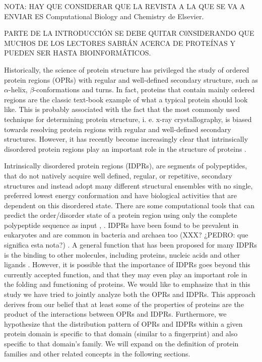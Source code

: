 \documentclass[preprint,12pt]{elsarticle}
\begin{document}
\par NOTA: HAY QUE CONSIDERAR QUE LA REVISTA A LA QUE SE VA A ENVIAR ES Computational Biology and Chemistry de Elsevier. \par PARTE DE LA INTRODUCCIÓN SE DEBE QUITAR C0NSIDERANDO QUE MUCHOS DE LOS LECTORES SABRÁN ACERCA DE PROTEÍNAS Y PUEDEN SER HASTA BIOINFORMÁTICOS. \par


Historically, the science of protein structure has privileged the study of ordered protein regions (OPRs)  with regular and well-defined secondary structure, such as  $\alpha$-helix, $\beta$-conformations and turns. In fact, proteins that contain mainly ordered regions are the classic text-book example of what a typical protein should look like. This is probably associated with the fact that the most commonly used technique for determining protein structure, i. e. x-ray crystallography, is biased towards resolving protein regions with regular and well-defined secondary structures. However,  it has recently become increasingly clear that intrinsically disordered protein regions play an important role in the structure of proteins \cite{oldfield2014intrinsically}.

Intrinsically disordered protein regions (IDPRs), are segments of polypeptides, that do not natively acquire well defined, regular, or repetitive, secondary structures and instead adopt many different structural ensembles with no single, preferred lowest energy conformation and have biological activities that are dependent on this disordered state. There are some computational tools that can predict the order/disorder state of a protein region using only the complete polypeptide sequence as input \cite{vucetic2004disprot},  \cite{piovesan2016disprot}. IDPRs have been found to be prevalent in eukaryotes and are common in bacteria and archaea too (XXX?  ¿PEDRO: que significa esta nota?)  \cite{dunker2000intrinsic} \cite{dunker2002intrinsic} \cite{dunker2013s} \cite{oldfield2014intrinsically}. A general function that has been proposed for many IDPRs is the binding to other molecules, including proteins, nucleic acids and other ligands \cite{dunker2001intrinsically} \cite{van2014classification} \cite{oldfield2014intrinsically}. However, it is possible that the importance of IDPRs goes beyond this currently accepted function, and that they may even play an important role in the folding and functioning of proteins. We would like to emphasize that in this study we have tried to jointly analyze both the OPRs and IDPRs. This approach derives from our belief that at least some of the properties of proteins are the product of the interactions between OPRs and IDPRs. Furthermore, we hypothesize that the distribution pattern of OPRs and IDPRs within a given protein domain is specific to that domain  (similar to a fingerprint) and also specific to that domain’s family. We will expand on the definition of protein families and other related concepts in the following sections. 
\end{document}
